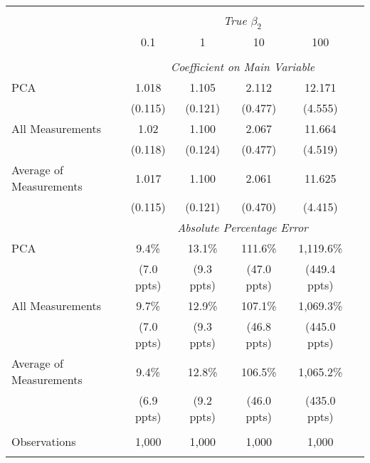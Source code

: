 \begin{table}[!htbp] \centering
\begin{tabular}{@{\extracolsep{5pt}}lccccc}
\\[-1.8ex]\hline
\hline \\[-1.8ex]
& \multicolumn{5}{c}{\textit{True $\beta_2$}} \
\cr 
\\[-1.8ex] & 0.1 & 1 & 10 & 100 \\
\hline \\[-1.8ex]
& \multicolumn{5}{c}{\textit{Coefficient on Main Variable}} \\
 PCA & 1.018 & 1.105 & 2.112 & 12.171  \\
  & (0.115) & (0.121) & (0.477) & (4.555)\\
 All Measurements & 1.02 & 1.100 & 2.067 & 11.664  \\
  & (0.118) & (0.124) & (0.477) & (4.519)\\
 Average of Measurements & 1.017 & 1.100 & 2.061 & 11.625  \\
  & (0.115) & (0.121) & (0.470) & (4.415)\\
& \multicolumn{5}{c}{\textit{Absolute Percentage Error}} \\
  PCA & 9.4\% & 13.1\% & 111.6\% & 1,119.6\%  \\
   & (7.0 ppts) & (9.3 ppts) & (47.0 ppts) & (449.4 ppts)\\
All Measurements & 9.7\% & 12.9\% & 107.1\% & 1,069.3\%  \\
  & (7.0 ppts) & (9.3 ppts) & (46.8 ppts) & (445.0 ppts)\\
  Average of Measurements & 9.4\% & 12.8\% & 106.5\% & 1,065.2\%  \\
  & (6.9 ppts) & (9.2 ppts) & (46.0 ppts) & (435.0 ppts)\\
\hline \\[-1.8ex]
 Observations & 1,000 & 1,000 & 1,000 & 1,000 &\\
\hline
\hline \\[-1.8ex]
\end{tabular}
\end{table}
